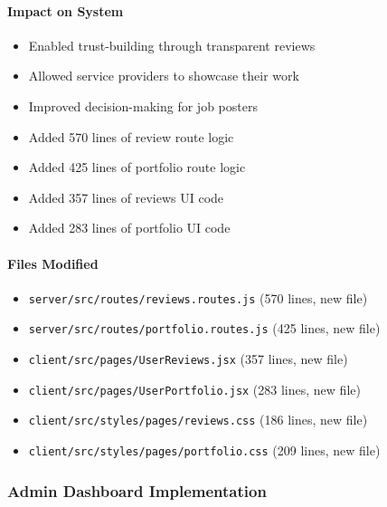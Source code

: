 \documentclass[11pt]{article}
\begin{document}
\paragraph{Impact on System}
\begin{itemize}[leftmargin=1.4em]
  \item Enabled trust-building through transparent reviews
  \item Allowed service providers to showcase their work
  \item Improved decision-making for job posters
  \item Added 570 lines of review route logic
  \item Added 425 lines of portfolio route logic
  \item Added 357 lines of reviews UI code
  \item Added 283 lines of portfolio UI code
\end{itemize}

\paragraph{Files Modified}
\begin{itemize}[leftmargin=1.4em]
  \item \texttt{server/src/routes/reviews.routes.js} (570 lines, new file)
  \item \texttt{server/src/routes/portfolio.routes.js} (425 lines, new file)
  \item \texttt{client/src/pages/UserReviews.jsx} (357 lines, new file)
  \item \texttt{client/src/pages/UserPortfolio.jsx} (283 lines, new file)
  \item \texttt{client/src/styles/pages/reviews.css} (186 lines, new file)
  \item \texttt{client/src/styles/pages/portfolio.css} (209 lines, new file)
\end{itemize}

\subsubsection{Admin Dashboard Implementation}
\end{document}
